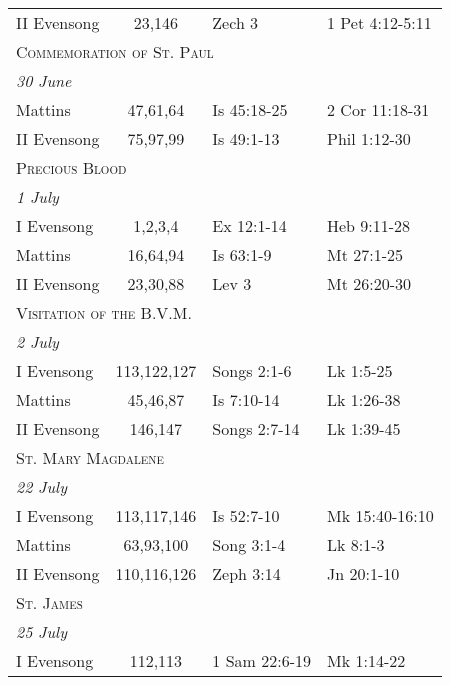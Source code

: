 \begin{longtable}{l c l l}
\hspace{1em} II Evensong&23,146&Zech 3&1 Pet 4:12-5:11\\
%
\multicolumn{4}{l}{\textsc{Commemoration of St. Paul}}\\
\multicolumn{4}{l}{\textit{30 June}}\\
\hspace{1em} Mattins&47,61,64&Is 45:18-25&2 Cor 11:18-31\\
\hspace{1em} II Evensong&75,97,99&Is 49:1-13&Phil 1:12-30\\
%
\multicolumn{4}{l}{\textsc{Precious Blood}}\\
\multicolumn{4}{l}{\textit{1 July}}\\
\hspace{1em} I Evensong&1,2,3,4&Ex 12:1-14&Heb 9:11-28\\
\hspace{1em} Mattins&16,64,94&Is 63:1-9&Mt 27:1-25\\
\hspace{1em} II Evensong&23,30,88&Lev 3&Mt 26:20-30\\
\multicolumn{4}{l}{\textsc{Visitation of the B.V.M.}}\\
\multicolumn{4}{l}{\textit{2 July}}\\
\hspace{1em} I Evensong&113,122,127&Songs 2:1-6&Lk 1:5-25\\
\hspace{1em} Mattins&45,46,87&Is 7:10-14&Lk 1:26-38\\
\hspace{1em} II Evensong&146,147&Songs 2:7-14&Lk 1:39-45\\
\multicolumn{4}{l}{\textsc{St. Mary Magdalene}}\\
\multicolumn{4}{l}{\textit{22 July}}\\
\hspace{1em} I Evensong&113,117,146&Is 52:7-10&Mk 15:40-16:10\\
\hspace{1em} Mattins&63,93,100&Song 3:1-4&Lk 8:1-3\\
\hspace{1em} II Evensong&110,116,126&Zeph 3:14&Jn 20:1-10\\
\multicolumn{4}{l}{\textsc{St. James}}\\
\multicolumn{4}{l}{\textit{25 July}}\\
\hspace{1em} I Evensong&112,113&1 Sam 22:6-19&Mk 1:14-22\\

\end{longtable}
